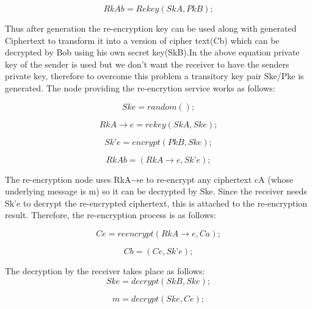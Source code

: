 \documentclass[12pt]{article}
\begin{document}
\begin{equation}
RkAb = Rekey( SkA , PkB) ;
\end{equation} 


Thus after generation the re-encryption key can be used along with generated Ciphertext to transform it into a version of cipher text(Cb) which can be decrypted by Bob using his own secret key(SkB).In the above equation private key of the sender is used but we don’t want the receiver to have the senders private key, therefore to overcome this problem a transitory key pair Ske/Pke  is generated. The node providing the re-encrytion service works as follows:

\begin{equation}
Ske = random();
\end{equation}

\begin{equation}
RkA→e = rekey(SkA , Ske);
\end{equation}

\begin{equation}
Sk’e = encrypt (PkB , Ske );
\end{equation}

\begin{equation}
RkAb = (RkA→e , Sk’e);
\end{equation}


The re-encryption node uses RkA→e to re-encrypt any ciphertext cA (whose underlying message is m) so it can be decrypted by Ske. Since the receiver needs Sk’e to decrypt the re-encrypted ciphertext, this is attached to the re-encryption result. Therefore, the re-encryption process is as follows:

\begin{equation}
Ce = reencrypt(RkA→e , Ca);
\end{equation}

\begin{equation}
Cb = (Ce , Sk’e);
\end{equation}

The decryption by the receiver takes place as follows:
\begin{equation}
Ske = decrypt (SkB , Ske );
\end{equation}

\begin{equation}
m = decrypt (Ske , Ce );
\end{equation}
\end{document}
